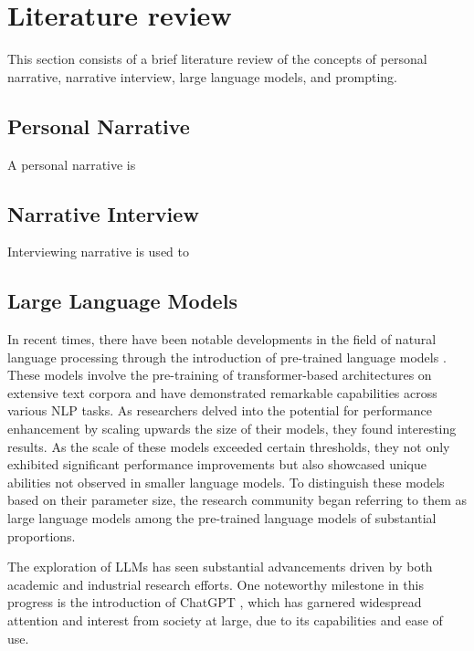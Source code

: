 \chapter{Literature review}
\label{cha:literature_review}
This section consists of a brief literature review of the concepts of personal narrative, narrative interview, large language models, and prompting. 


\section{Personal Narrative}
A personal narrative is \cite{}
\section{Narrative Interview}
Interviewing narrative is used to
\section{Large Language Models}
In recent times, there have been notable developments in the field of natural language processing through the introduction of pre-trained language models \cite{radford2018improving}. These models involve the pre-training of transformer-based architectures \cite{vaswani2017attention} on extensive text corpora and have demonstrated remarkable capabilities across various NLP tasks. As researchers delved into the potential for performance enhancement by scaling upwards the size of their models, they found interesting results. As the scale of these models exceeded certain thresholds, they not only exhibited significant performance improvements but also showcased unique abilities not observed in smaller language models. To distinguish these models based on their parameter size, the research community began referring to them as large language models among the pre-trained language models of substantial proportions. \cite{zhao2023survey,huang2022towards,wei2022emergent}

The exploration of LLMs has seen substantial advancements driven by both academic and industrial research efforts. One noteworthy milestone in this progress is the introduction of ChatGPT \cite{chatgpt}, which has garnered widespread attention and interest from society at large, due to its capabilities and ease of use.

